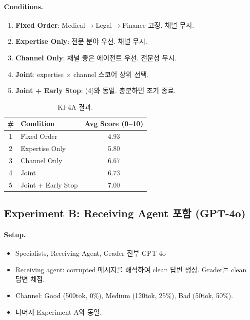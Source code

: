 \documentclass[11pt]{article}
\begin{document}
\paragraph{Conditions.}
\begin{enumerate}[nosep]
  \item \textbf{Fixed Order}: Medical$\rightarrow$Legal$\rightarrow$Finance 고정. 채널 무시.
  \item \textbf{Expertise Only}: 전문 분야 우선. 채널 무시.
  \item \textbf{Channel Only}: 채널 좋은 에이전트 우선. 전문성 무시.
  \item \textbf{Joint}: expertise $\times$ channel 스코어 상위 선택.
  \item \textbf{Joint + Early Stop}: (4)와 동일. 충분하면 조기 종료.
\end{enumerate}

\begin{table}[h]
\centering
\caption{KI-4A 결과.}
\begin{tabular}{clc}
\toprule
\# & Condition & Avg Score (0--10) \\
\midrule
1 & Fixed Order       & 4.93 \\
2 & Expertise Only    & 5.80 \\
3 & Channel Only      & 6.67 \\
4 & Joint             & 6.73 \\
5 & Joint + Early Stop & 7.00 \\
\bottomrule
\end{tabular}
\end{table}


\subsection{Experiment B: Receiving Agent 포함 (GPT-4o)}

\paragraph{Setup.}
\begin{itemize}[nosep]
  \item Specialists, Receiving Agent, Grader 전부 GPT-4o
  \item Receiving agent: corrupted 메시지를 해석하여 clean 답변 생성. Grader는 clean 답변 채점.
  \item Channel: Good (500tok, 0\%), Medium (120tok, 25\%), Bad (50tok, 50\%).
  \item 나머지 Experiment A와 동일.
\end{itemize}
\end{document}
